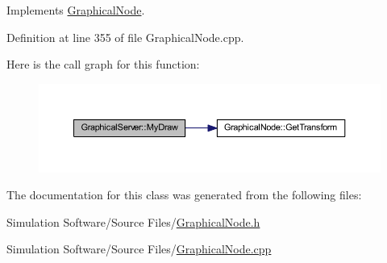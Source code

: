 Implements \hyperlink{class_graphical_node_a4a5d4f48454a9721a940499d4f59b0ce}{Graphical\+Node}.



Definition at line 355 of file Graphical\+Node.\+cpp.

Here is the call graph for this function\+:
\nopagebreak
\begin{figure}[H]
\begin{center}
\leavevmode
\includegraphics[width=350pt]{class_graphical_server_ad144b6cfdf945981fd0db425dfc41e5b_cgraph}
\end{center}
\end{figure}


The documentation for this class was generated from the following files\+:\begin{DoxyCompactItemize}
\item 
Simulation Software/\+Source Files/\hyperlink{_graphical_node_8h}{Graphical\+Node.\+h}\item 
Simulation Software/\+Source Files/\hyperlink{_graphical_node_8cpp}{Graphical\+Node.\+cpp}\end{DoxyCompactItemize}
